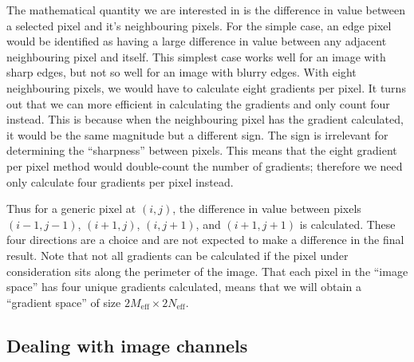 \documentclass[11pt]{article}
\begin{document}
The mathematical quantity we are interested in is the difference in value between a selected pixel and it's neighbouring pixels. For the simple case, an edge pixel would be identified as having a large difference in value between any adjacent neighbouring pixel and itself. This simplest case works well for an image with sharp edges, but not so well for an image with blurry edges. With eight neighbouring pixels, we would have to calculate eight gradients per pixel. It turns out that we can more efficient in calculating the gradients and only count four instead. This is because when the neighbouring pixel has the gradient calculated, it would be the same magnitude but a different sign. The sign is irrelevant for determining the ``sharpness'' between pixels. This means that the eight gradient per pixel method would double-count the number of gradients; therefore we need only calculate four gradients per pixel instead.

Thus for a generic pixel at $(i,j)$, the difference in value between pixels $(i-1,j-1)$, $(i+1,j)$, $(i,j+1)$, and $(i+1,j+1)$ is calculated. These four directions are a choice and are not expected to make a difference in the final result. Note that not all gradients can be calculated if the pixel under consideration sits along the perimeter of the image. That each pixel in the ``image space'' has four unique gradients calculated, means that we will obtain a ``gradient space'' of size $2M_{\text{eff}} \times 2N_{\text{eff}}$.

\subsection{Dealing with image channels}
\end{document}
